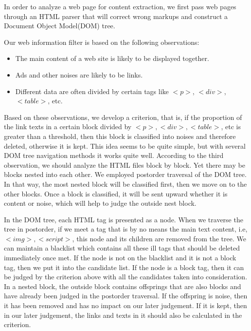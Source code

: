 In order to analyze a web page for content extraction, we first pass web pages through an HTML parser that will correct wrong markups and construct a Document Object Model(DOM) tree.

Our web information filter is based on the following observations:
\begin{itemize}
\item The main content of a web site is likely to be displayed together.
\item Ads and other noises are likely to be links.
\item Different data are often divided by certain tags like $<p>$, $<div>$, $<table>$, etc.
\end{itemize}
Based on these observations, we develop a criterion, that is, if the proportion of the link texts in a certain block divided by $<p>, <div>, <table>$, etc is greater than a threshold, then this block is classified into noises and therefore deleted, otherwise it is kept. This idea seems to be quite simple, but with several DOM tree navigation methods it works quite well.
According to the third observation, we should analyze the HTML files block by block. Yet there may be blocks nested into each other. We employed postorder traversal of the DOM tree. In that way, the most nested block will be classified first, then we move on to the other blocks. Once a block is classified, it will be sent upward whether it is content or noise, which will help to judge the outside nest block.

In the DOM tree, each HTML tag is presented as a node. When we traverse the tree in postorder, if we meet a tag that is by no means the main text content, i.e, $<img>, <script>$, this node and its children are removed from the tree. We can maintain a blacklist which contains all these ill tags that should be deleted immediately once met. If the node is not on the blacklist and it is not a block tag, then we put it into the candidate list. If the node is a block tag, then it can be judged by the criterion above with all the candidates taken into consideration. In a nested block, the outside block contains offsprings that are also blocks and have already been judged in the postorder traversal. If the offspring is noise, then it has been removed and has no impact on our later judgement. If it is kept, then in our later judgement, the links and texts in it should also be calculated in the criterion.

